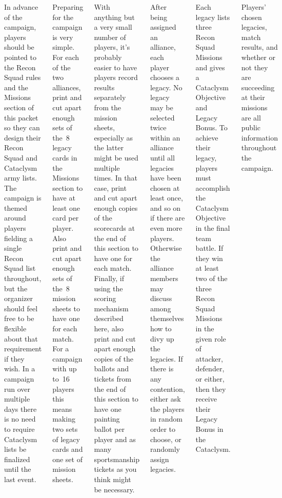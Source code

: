 \begin{columns}
In advance of the campaign, players should be pointed to the Recon
Squad rules and the Missions section of this packet so they can design
their Recon Squad and Cataclysm army lists.  The campaign is themed
around players fielding a single Recon Squad list throughout, but the
organizer should feel free to be flexible about that requirement if
they wish.  In a campaign run over multiple days there is no need to
require Cataclysm lists be finalized until the last event.

Preparing for the campaign is very simple.  For each of the two
alliances, print and cut apart enough sets of the~8 legacy cards in
the Missions section to have at least one card per player.
Also print and cut apart enough sets of the~8 mission sheets to have
one for each match.  For a campaign with up to~16 players this means
making two sets of legacy cards and one set of mission sheets.

With anything but a very small number of players, it's probably easier
to have players record results separately from the mission sheets,
especially as the latter might be used multiple times.  In that case,
print and cut apart enough copies of the scorecards at the end of this
section to have one for each match.  Finally, if using the scoring
mechanism described here, also print and cut apart enough copies of
the ballots and tickets from the end of this section to have one
painting ballot per player and as many sportsmanship tickets as you
think might be necessary.


After being assigned an alliance, each player chooses a legacy.  No
legacy may be selected twice within an alliance until all legacies
have been chosen at least once, and so on if there are even more
players.  Otherwise the alliance members may discuss among themselves
how to divy up the legacies.  If there is any contention, either ask
the players in random order to choose, or randomly assign legacies.

Each legacy lists three Recon Squad Missions and gives a Cataclysm
Objective and Legacy Bonus.  To achieve their legacy, players must
accomplish the Cataclysm Objective in the final team battle.  If they
win at least two of the three Recon Squad Missions in the given role
of attacker, defender, or either, then they receive their Legacy Bonus
in the Cataclysm.

Players' chosen legacies, match results, and whether or not they are
succeeding at their missions are all public information throughout the
campaign.


\end{columns}
